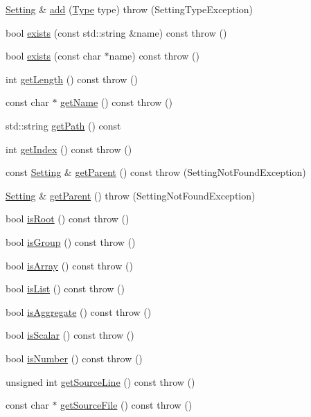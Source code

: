 \begin{DoxyCompactItemize}
\item 
\hyperlink{classlibconfig_1_1_setting}{Setting} \& \hyperlink{classlibconfig_1_1_setting_a32fdd08f5b3d856f7d706867fa8d7074}{add} (\hyperlink{classlibconfig_1_1_setting_a42f760ff88654e784477a6f040267bb4}{Type} type)  throw (SettingTypeException)
\item 
bool \hyperlink{classlibconfig_1_1_setting_a1bf8273fc34c8d965b4c110815c5dda3}{exists} (const std::string \&name) const   throw ()
\item 
bool \hyperlink{classlibconfig_1_1_setting_a1f5a2e3b389c28c18f8e0b21948480f5}{exists} (const char $\ast$name) const   throw ()
\item 
int \hyperlink{classlibconfig_1_1_setting_a150d10fa07afab2e5e65ac5fa1c40f40}{getLength} () const   throw ()
\item 
const char $\ast$ \hyperlink{classlibconfig_1_1_setting_a2b5310a3a8b784c76f2d838b3861527c}{getName} () const   throw ()
\item 
std::string \hyperlink{classlibconfig_1_1_setting_a7646f4ee12327170117a35fc248beff8}{getPath} () const 
\item 
int \hyperlink{classlibconfig_1_1_setting_a80146d2ef242ec06fb4766b375c0cd1c}{getIndex} () const   throw ()
\item 
const \hyperlink{classlibconfig_1_1_setting}{Setting} \& \hyperlink{classlibconfig_1_1_setting_a5dbfe99711fd915483fd318695a6b42c}{getParent} () const   throw (SettingNotFoundException)
\item 
\hyperlink{classlibconfig_1_1_setting}{Setting} \& \hyperlink{classlibconfig_1_1_setting_afe7957eeaed5e8f20cb6d08edfda3aac}{getParent} ()  throw (SettingNotFoundException)
\item 
bool \hyperlink{classlibconfig_1_1_setting_a6e73e9387d36975436418b8a509f979d}{isRoot} () const   throw ()
\item 
bool \hyperlink{classlibconfig_1_1_setting_a2104d6bdfb12ea47897c806058c38eee}{isGroup} () const   throw ()
\item 
bool \hyperlink{classlibconfig_1_1_setting_a412c26d5650317469dbadb5e9c021ca6}{isArray} () const   throw ()
\item 
bool \hyperlink{classlibconfig_1_1_setting_aa87c4f6efac4dbe6113acf5b5c52a9a6}{isList} () const   throw ()
\item 
bool \hyperlink{classlibconfig_1_1_setting_a54e002cdff43b3d86abf8ee8aec46d9c}{isAggregate} () const   throw ()
\item 
bool \hyperlink{classlibconfig_1_1_setting_ad54ec1ccdfa33295b5d665ca93544c87}{isScalar} () const   throw ()
\item 
bool \hyperlink{classlibconfig_1_1_setting_af9fdefc564d0cc82ddc1052c2afab6af}{isNumber} () const   throw ()
\item 
unsigned int \hyperlink{classlibconfig_1_1_setting_af789d129c32aa5119afb13a43cbad3c0}{getSourceLine} () const   throw ()
\item 
const char $\ast$ \hyperlink{classlibconfig_1_1_setting_ad7dee0de27baf79df645ef0fa499f2f7}{getSourceFile} () const   throw ()
\end{DoxyCompactItemize}
